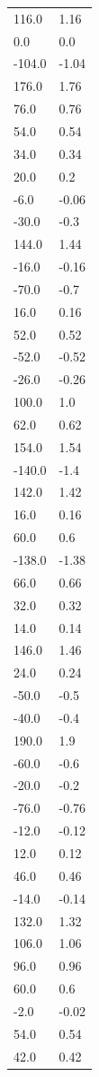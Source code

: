 \begin{longtable}{ll}
116.0 & 1.16 \\
0.0 & 0.0 \\
-104.0 & -1.04 \\
176.0 & 1.76 \\
76.0 & 0.76 \\
54.0 & 0.54 \\
34.0 & 0.34 \\
20.0 & 0.2 \\
-6.0 & -0.06 \\
-30.0 & -0.3 \\
144.0 & 1.44 \\
-16.0 & -0.16 \\
-70.0 & -0.7 \\
16.0 & 0.16 \\
52.0 & 0.52 \\
-52.0 & -0.52 \\
-26.0 & -0.26 \\
100.0 & 1.0 \\
62.0 & 0.62 \\
154.0 & 1.54 \\
-140.0 & -1.4 \\
142.0 & 1.42 \\
16.0 & 0.16 \\
60.0 & 0.6 \\
-138.0 & -1.38 \\
66.0 & 0.66 \\
32.0 & 0.32 \\
14.0 & 0.14 \\
146.0 & 1.46 \\
24.0 & 0.24 \\
-50.0 & -0.5 \\
-40.0 & -0.4 \\
190.0 & 1.9 \\
-60.0 & -0.6 \\
-20.0 & -0.2 \\
-76.0 & -0.76 \\
-12.0 & -0.12 \\
12.0 & 0.12 \\
46.0 & 0.46 \\
-14.0 & -0.14 \\
132.0 & 1.32 \\
106.0 & 1.06 \\
96.0 & 0.96 \\
60.0 & 0.6 \\
-2.0 & -0.02 \\
54.0 & 0.54 \\
42.0 & 0.42 \\

\end{longtable}

